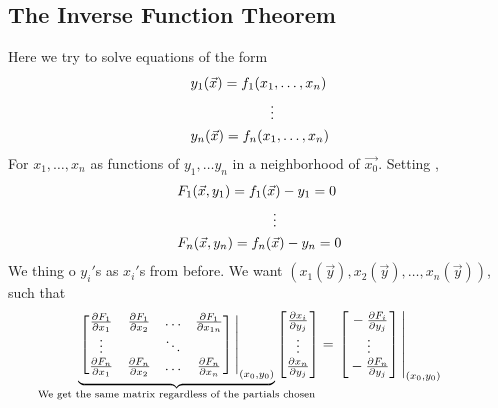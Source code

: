 \documentclass[
	12pt,
	]{article}
\theoremstyle{custom}
\theoremstyle{custom}
\theoremstyle{custom}
\theoremstyle{custom}
\theoremstyle{custom}
\theoremstyle{definition}
\theoremstyle{example}
\theoremstyle{note}
\theoremstyle{remark}
\theoremstyle{example}
\numberwithin{equation}{subsection}
\begin{document}
	   		 \subsection{The Inverse Function Theorem}
	   		 Here we try to solve equations of the form 
	   		 \begin{align*}
	   		 	&y_{1}(\vec{x}) = f_{1}(x_{1}, \dots ,x_{n}) \\
	   		 	&\hspace{2 cm}\vdots  \\
	   		 	&y_{n}(\vec{x}) = f_{n}(x_{1}, \dots ,x_{n}) 
	   		 \end{align*}
	   		 For $x_{1}, \dots , x_{n}$ as functions of $y_{1}, \dots y_{n}$ in a neighborhood of $\vec{x_{0}}$. Setting , 
	   		 \begin{align*}
	   		 	&F_{1}(\vec{x}, y_{1}) = f_{1}(\vec{x}) - y_{1} =0 \\
	   		 	&\hspace{2.42 cm}\vdots  \\
	   		 	&F_{n}(\vec{x}, y_{n}) = f_{n}(\vec{x}) - y_{n} =0 
	   		 \end{align*}
	   		 We thing o $y_{i}'$s as $x_{i}'$s from before. We want $(x_{1}(\vec{y}), x_{2}(\vec{y}),\dots,x_{n}(\vec{y}))$, such that 
	   		 \begin{equation*}
	   		 	\underbrace{\eval{\begin{bmatrix}
	   		 		\pdv{F_{1}}{x_{1}} & \pdv{F_{1}}{x_{2}} & \dots & \pdv{F_{1}}{x_{1n}} \\
	   		 		\vdots & & \ddots & \\
	   		 		\pdv{F_{n}}{x_{1}} & \pdv{F_{n}}{x_{2}} & \dots & \pdv{F_{n}}{x_{n}} 
	   		 	\end{bmatrix}}_{(x_{0},y_{0})}}_{\mathclap{\text{We get the same matrix regardless of the partials chosen}}}
	   		 	\begin{bmatrix}
	   		 		\vphantom{\pdv{F_{1}}{x_{1}}}\pdv{x_{i}}{y_{j}} \\
	   		 		\vdots \\
	   		 		\vphantom{\pdv{F_{1}}{x_{1}}}\pdv{x_{n}}{y_{j}}
	   		 	\end{bmatrix} 
	   		 	=
	   		 	\eval{\begin{bmatrix}
	   		 		\vphantom{\pdv{F_{1}}{x_{1}}}-\pdv{F_{i}}{y_{j}} \\
	   		 		\vdots \\
	   		 		\vphantom{\pdv{F_{1}}{x_{1}}} - \pdv{F_{n}}{y_{j}}
	   		 	\end{bmatrix}}_{(x_{0},y_{0})}
	   		 \end{equation*}
\end{document}
